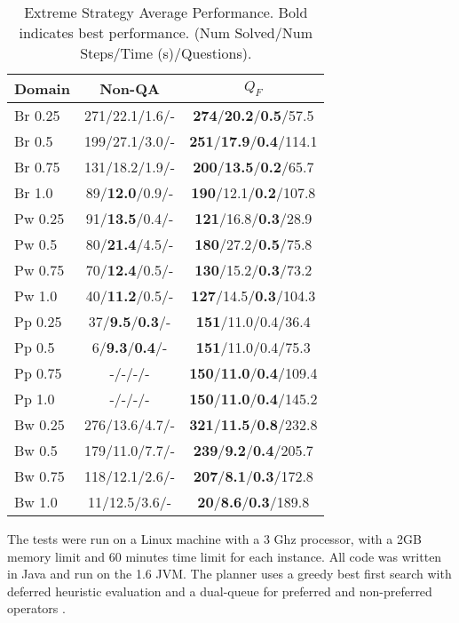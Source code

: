 \documentclass{article}
\begin{document}
\begin{table}[t]\small\centering\begin{tabular}{|l|cc|}\hline
Domain & Non-QA  &  $Q_F$ \\ \hline
Br	0.25	&271/22.1/1.6/- 	&{\bf 274}/{\bf 20.2}/{\bf 0.5}/57.5 	\\ \hline
Br	0.5	&199/27.1/3.0/- 	&{\bf 251}/{\bf 17.9}/{\bf 0.4}/114.1 	\\ \hline
Br	0.75	&131/18.2/1.9/- 	&{\bf 200}/{\bf 13.5}/{\bf 0.2}/65.7 	\\ \hline
Br	1.0	&89/{\bf 12.0}/0.9/- 	&{\bf 190}/12.1/{\bf 0.2}/107.8 	\\ \hline
\hline
Pw	0.25	&91/{\bf 13.5}/0.4/- 	&{\bf 121}/16.8/{\bf 0.3}/28.9 	\\ \hline
Pw	0.5	&80/{\bf 21.4}/4.5/- 	&{\bf 180}/27.2/{\bf 0.5}/75.8 	\\ \hline
Pw	0.75	&70/{\bf 12.4}/0.5/- 	&{\bf 130}/15.2/{\bf 0.3}/73.2 	\\ \hline
Pw	1.0	&40/{\bf 11.2}/0.5/- 	&{\bf 127}/14.5/{\bf 0.3}/104.3 	\\ \hline
\hline
Pp	0.25	&37/{\bf 9.5}/{\bf 0.3}/- 	&{\bf 151}/11.0/0.4/36.4 	\\ \hline
Pp	0.5	&6/{\bf 9.3}/{\bf 0.4}/- 	&{\bf 151}/11.0/0.4/75.3 	\\ \hline
Pp	0.75	&-/-/-/-  	&{\bf 150}/{\bf 11.0}/{\bf 0.4}/109.4 	\\ \hline
Pp	1.0	&-/-/-/-  	&{\bf 150}/{\bf 11.0}/{\bf 0.4}/145.2 	\\ \hline
\hline
Bw	0.25	&276/13.6/4.7/- 	&{\bf 321}/{\bf 11.5}/{\bf 0.8}/232.8 	\\ \hline
Bw	0.5	&179/11.0/7.7/- 	&{\bf 239}/{\bf 9.2}/{\bf 0.4}/205.7 	\\ \hline
Bw	0.75	&118/12.1/2.6/- 	&{\bf 207}/{\bf 8.1}/{\bf 0.3}/172.8 	\\ \hline
Bw	1.0	&11/12.5/3.6/- 	&{\bf 20}/{\bf 8.6}/{\bf 0.3}/189.8 	\\ \hline
\end{tabular}\caption{\label{tab:questionComp2} Extreme Strategy Average
Performance. Bold indicates best performance.  (Num Solved/Num
Steps/Time (s)/Questions).}\end{table}
 


 The tests were run on a Linux machine with a 3 Ghz processor,
with a  2GB memory limit and 60 minutes time limit for each instance. All code
was written in Java and run on the 1.6 JVM. The  planner uses a greedy
best first search with deferred heuristic evaluation and a dual-queue for
preferred and non-preferred operators \citep{DBLP:journals/jair/Helmert06}. 
\end{document}
